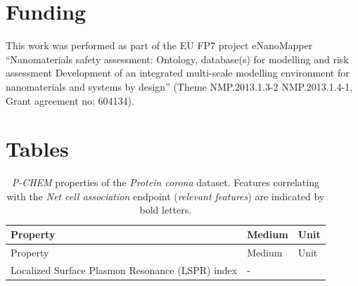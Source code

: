 \documentclass[utf8]{frontiersHLTH} %
\begin{document}
\section{Funding}\label{funding}

This work was performed as part of the EU FP7 project eNanoMapper
``Nanomaterials safety assessment: Ontology, database(s) for modelling
and risk assessment Development of an integrated multi-scale modelling
environment for nanomaterials and systems by design'' (Theme
NMP.2013.1.3-2 NMP.2013.1.4-1, Grant agreement no: 604134).

\section{Tables}\label{tables}

\begin{longtable}[]{@{}lll@{}}
\caption{\emph{P-CHEM} properties of the \emph{Protein corona} dataset.
Features correlating with the \emph{Net cell association} endpoint
(\emph{relevant features}) are indicated by bold letters.
}\tabularnewline
\toprule
\begin{minipage}[b]{0.58\columnwidth}\raggedright\strut
Property\strut
\end{minipage} & \begin{minipage}[b]{0.20\columnwidth}\raggedright\strut
Medium\strut
\end{minipage} & \begin{minipage}[b]{0.13\columnwidth}\raggedright\strut
Unit\strut
\end{minipage}\tabularnewline
\midrule
\endfirsthead
\toprule
\begin{minipage}[b]{0.58\columnwidth}\raggedright\strut
Property\strut
\end{minipage} & \begin{minipage}[b]{0.20\columnwidth}\raggedright\strut
Medium\strut
\end{minipage} & \begin{minipage}[b]{0.13\columnwidth}\raggedright\strut
Unit\strut
\end{minipage}\tabularnewline
\midrule
\endhead
\begin{minipage}[t]{0.58\columnwidth}\raggedright\strut
Localized Surface Plasmon Resonance (LSPR) index\strut
\end{minipage} & \begin{minipage}[t]{0.20\columnwidth}\raggedright\strut
-\strut
\end{minipage} & \begin{minipage}[t]{0.13\columnwidth}\raggedright\strut

\end{minipage}
\end{longtable}
\end{document}
